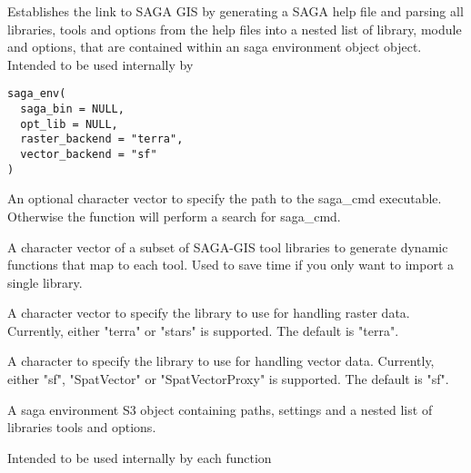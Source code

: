 \documentclass[a4paper]{book}
\begin{document}
%
\begin{Description}
Establishes the link to SAGA GIS by generating a SAGA help file and parsing
all libraries, tools and options from the help files into a nested list of
library, module and options, that are contained within an saga environment
object object. Intended to be used internally by 
\end{Description}
%
\begin{Usage}
\begin{verbatim}
saga_env(
  saga_bin = NULL,
  opt_lib = NULL,
  raster_backend = "terra",
  vector_backend = "sf"
)
\end{verbatim}
\end{Usage}
%
\begin{Arguments}
\begin{ldescription}
\item[\code{saga\_bin}] An optional character vector to specify the path to the
saga\_cmd executable. Otherwise the function will perform a search for
saga\_cmd.

\item[\code{opt\_lib}] A character vector of a subset of SAGA-GIS tool libraries to
generate dynamic functions that map to each tool. Used to save time if you
only want to import a single library.

\item[\code{raster\_backend}] A character vector to specify the library to use for
handling raster data. Currently, either "terra" or "stars" is
supported. The default is "terra".

\item[\code{vector\_backend}] A character to specify the library to use for handling
vector data. Currently, either "sf", "SpatVector" or "SpatVectorProxy" is
supported. The default is "sf".
\end{ldescription}
\end{Arguments}
%
\begin{Value}
A saga environment S3 object containing paths, settings and a nested
list of libraries tools and options.
\end{Value}
%
\begin{Description}
Intended to be used internally by each function
\end{Description}
\end{document}
